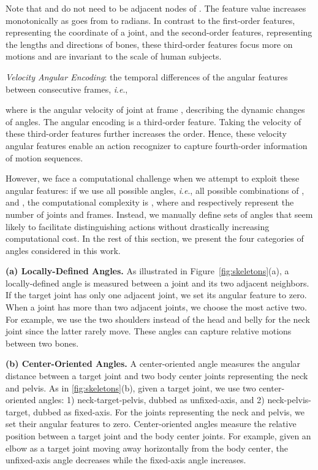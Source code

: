 \documentclass[journal,comsoc]{IEEEtran}
\newcommand{\ie}{\textit{i}.\textit{e}.,}
\begin{document}
Note that  and  do not need to be adjacent nodes of . The feature value increases monotonically as  goes from  to  radians. 
In contrast to the first-order features, representing the coordinate of a joint, and the second-order features, representing the lengths and directions of bones, these third-order features focus more on motions and are invariant to the scale of human subjects. 

\textit{Velocity Angular Encoding}: the temporal differences of the angular features between consecutive frames, \ie

where  is the angular velocity of joint  at frame , describing the dynamic changes of angles. The angular encoding is a third-order feature. Taking the velocity of these third-order features further increases the order. Hence, these velocity angular features enable an action recognizer to capture fourth-order information of motion sequences. 

However, we face a computational challenge when we attempt to exploit these angular features: if we use all possible angles, \ie{} all possible combinations of ,  and , the computational complexity is , where  and  respectively represent the number of joints and frames.
Instead, we manually define sets of angles that seem likely to facilitate distinguishing actions without drastically increasing computational cost. In the rest of this section, we present the four categories of angles considered in this work.

\textbf{(a) Locally-Defined Angles.} As illustrated in Figure~\ref{fig:skeletons}(a), a locally-defined angle is measured between a joint and its two adjacent neighbors. If the target joint has only one adjacent joint, we set its angular feature to zero. When a joint has more than two adjacent joints, we choose the most active two. For example, we use the two shoulders instead of the head and belly for the neck joint since the latter rarely move. 
These angles can capture relative motions between two bones. 

\textbf{(b) Center-Oriented Angles.} A center-oriented angle measures the angular distance between a target joint and two body center joints representing the neck and pelvis. As in \autoref{fig:skeletons}(b), given a target joint, we use two center-oriented angles: 1) neck-target-pelvis, dubbed as unfixed-axis, and 2) neck-pelvis-target, dubbed as fixed-axis. For the joints representing the neck and pelvis, we set their angular features to zero.
Center-oriented angles measure the relative position between a target joint and the body center joints. For example, given an elbow as a target joint moving away horizontally from the body center, the unfixed-axis angle decreases while the fixed-axis angle increases. 
\end{document}
